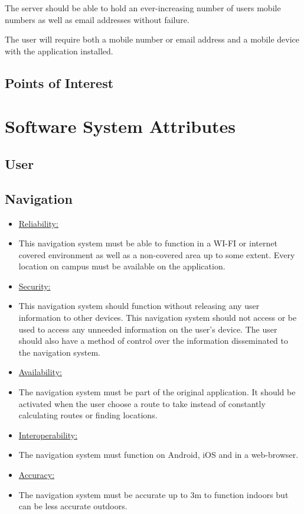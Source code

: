 \documentclass[runningheads,a4paper]{article}
\begin{document}
The server should be able to hold an ever-increasing number of users mobile numbers as well as email addresses without failure.  

The user will require both a mobile number or email address and a mobile device with the application installed.

\subsection{Points of Interest}


\section{Software System Attributes}

\subsection{User}
\subsection{Navigation}
\begin{itemize}
\item \underline{Reliability:} 
\item This navigation system must be able to function in a WI-FI or internet covered environment as well as a non-covered area up to some extent. Every location on campus must be available on the application. 

\item \underline{Security:}
\item This navigation system should function without releasing any user information to other devices. This navigation system should not access or be used to access any unneeded information on the user’s device. 
The user should also have a method of control over the information disseminated to the navigation system.

\item \underline{Availability:}
\item The navigation system must be part of the original application. It should be activated when the user choose a route to take instead of constantly calculating routes or finding locations. 

\item \underline{Interoperability:}
\item The navigation system must function on Android, iOS and in a web-browser.

\item \underline{Accuracy:}
\item The navigation system must be accurate up to 3m to function indoors but can be less accurate outdoors. 
\end{itemize}
\end{document}
